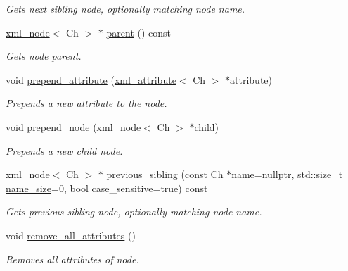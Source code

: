 \begin{DoxyCompactItemize}
\begin{DoxyCompactList}\small\item\em Gets next sibling node, optionally matching node name. \end{DoxyCompactList}\item 
\mbox{\hyperlink{classrapidxml_1_1xml__node}{xml\+\_\+node}}$<$ Ch $>$ $\ast$ \mbox{\hyperlink{classrapidxml_1_1xml__base_a7f177e162f72f65ea1f0f0188e41c1ba}{parent}} () const
\begin{DoxyCompactList}\small\item\em Gets node parent. \end{DoxyCompactList}\item 
void \mbox{\hyperlink{classrapidxml_1_1xml__node_af6dffa513da74cc0be71a7ba84f8265e}{prepend\+\_\+attribute}} (\mbox{\hyperlink{classrapidxml_1_1xml__attribute}{xml\+\_\+attribute}}$<$ Ch $>$ $\ast$attribute)
\begin{DoxyCompactList}\small\item\em Prepends a new attribute to the node. \end{DoxyCompactList}\item 
void \mbox{\hyperlink{classrapidxml_1_1xml__node_a0c39df6617e709eb2fba11300dea63f2}{prepend\+\_\+node}} (\mbox{\hyperlink{classrapidxml_1_1xml__node}{xml\+\_\+node}}$<$ Ch $>$ $\ast$child)
\begin{DoxyCompactList}\small\item\em Prepends a new child node. \end{DoxyCompactList}\item 
\mbox{\hyperlink{classrapidxml_1_1xml__node}{xml\+\_\+node}}$<$ Ch $>$ $\ast$ \mbox{\hyperlink{classrapidxml_1_1xml__node_a5fd85382924d5c9bd6dc375855db5344}{previous\+\_\+sibling}} (const Ch $\ast$\mbox{\hyperlink{classrapidxml_1_1xml__base_af8436e9ee14c127220113eaa956eafee}{name}}=nullptr, std\+::size\+\_\+t \mbox{\hyperlink{classrapidxml_1_1xml__base_ad01e2eff02202b130baad012d1ed7328}{name\+\_\+size}}=0, bool case\+\_\+sensitive=true) const
\begin{DoxyCompactList}\small\item\em Gets previous sibling node, optionally matching node name. \end{DoxyCompactList}\item 
void \mbox{\hyperlink{classrapidxml_1_1xml__node_a59e6ad4cfd5e8096c052e71d79561eda}{remove\+\_\+all\+\_\+attributes}} ()
\begin{DoxyCompactList}\small\item\em Removes all attributes of node. \end{DoxyCompactList}\item 

\end{DoxyCompactItemize}
